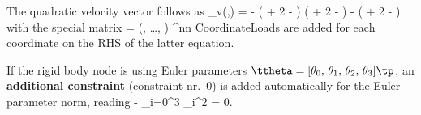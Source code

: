     The quadratic velocity vector follows as
    \be
      \fv_{v}(\qv,\dot \qv) = \vr
      {- \tPhi\indt\tp {}\left( \omegaBDtilde \omegaBDtilde {} + 
                                                     2 \omegaBDtilde {}\indf - 
                                                       \dot \ttheta \right)}
      {\tp {}  \left( \omegaBDtilde \omegaBDtilde {} + 
                                                     2 \omegaBDtilde {}\indf - 
                                                       \dot \ttheta \right)}
      {- \left( \omegaBDtilde \omegaBDtilde {} + 
                                                     2 \omegaBDtilde {}\indf - 
                                                       \dot \ttheta \right)}
    \ee
    with the special matrix
    \be
      \omegaBDtilde = \left(, \; \ldots ,\;   \right)
      \in \Rcal^{n\indf \times n\indf}
    \ee
    CoordinateLoads are added for each  coordinate on the RHS of the latter equation. 
    
    \noindent If the rigid body node is using Euler parameters $\ttheta = [\theta_0,\,\theta_1,\,\theta_2,\,\theta_3]\tp$, an {\bf additional constraint} (constraint nr.\ 0) is 
    added automatically for the Euler parameter norm, reading
     - \sum_{i=0}^{3} \theta_i^2 = 0.
    \ee
    
